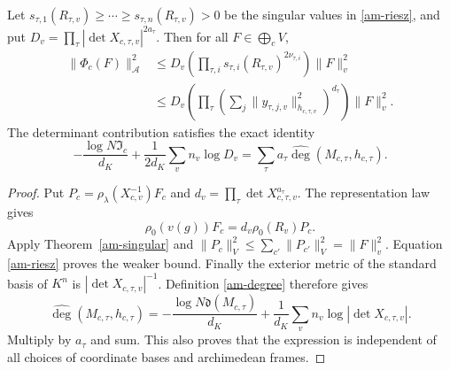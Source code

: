 \begin{proposition}\label{am-class-bound}
Let $s_{\tau,1}(R_{\tau,v})\ge\cdots\ge s_{\tau,n}(R_{\tau,v})>0$
be the singular values in \eqref{am-riesz}, and put
$D_v=\prod_\tau|\det X_{c,\tau,v}|^{2a_\tau}$.
Then for all $F\in\bigoplus_cV$,
\begin{align}
 \|\Phi_c(F)\|_{\mathcal A}^2
 &\le D_v\left(\prod_{\tau,i}
                   s_{\tau,i}(R_{\tau,v})^{2\nu_{\tau,i}}\right)\|F\|_v^2
                          \label{am-class-sharp}\\
 &\le D_v\left(\prod_\tau
       \left(\sum_j\|y_{\tau,j,v}\|_{h_{c,\tau,v}}^2\right)^{d_\tau}\right)
                                                        \|F\|_v^2.
                          \label{am-class-hs}
\end{align}
The determinant contribution satisfies the exact identity
\begin{equation}\label{am-det-cancel}
 -\frac{\log N\mathfrak I_c}{d_K}
       +\frac1{2d_K}\sum_v n_v\log D_v
             =\sum_\tau a_\tau\widehat{\deg}(M_{c,\tau},h_{c,\tau}).
\end{equation}
\end{proposition}
\begin{proof}
Put $P_c=\rho_\lambda(X_{c,v}^{-1})F_c$ and
$d_v=\prod_\tau\det X_{c,\tau,v}^{a_\tau}$. The representation law gives
\[
             \rho_0(v(g))F_c=d_v\rho_0(R_v)P_c.
\]
Apply Theorem~\ref{am-singular} and
$\|P_c\|_V^2\le\sum_{c'}\|P_{c'}\|_V^2=\|F\|_v^2$.
Equation \eqref{am-riesz} proves the weaker bound.
Finally the exterior metric of the standard basis of $K^n$ is
$|\det X_{c,\tau,v}|^{-1}$. Definition \eqref{am-degree} therefore gives
\[
 \widehat{\deg}(M_{c,\tau},h_{c,\tau})
 =-\frac{\log N\mathfrak d(M_{c,\tau})}{d_K}
        +\frac1{d_K}\sum_v n_v\log|\det X_{c,\tau,v}|.
\]
Multiply by $a_\tau$ and sum. This also proves that the expression is
independent of all choices of coordinate bases and archimedean frames.
\end{proof}

